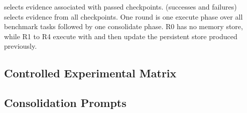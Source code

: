  selects evidence associated with passed checkpoints. 
(successes and failures) selects evidence from all checkpoints. One round is one execute phase over all
benchmark tasks followed by one consolidate phase. R0 has no memory
store, while R1 to R4 execute with and then update the persistent store
produced previously.

\subsection{Controlled Experimental Matrix}

\begin{table}[h]
\caption{\textbf{Controlled experimental matrix.} Each experiment varies one
focal dimension while fixing the remaining dimensions.}
\label{tab:experiment-matrix}
\centering
{}
\end{table}

\subsection{Consolidation Prompts}
